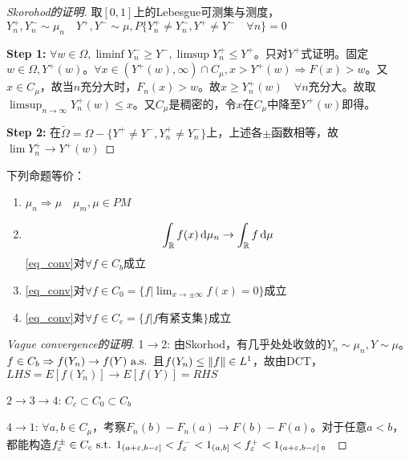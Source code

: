 \documentclass{ctexbook}
\begin{document}
\begin{proof}[Skorohod的证明]
  取$[0,1]$上的Lebesgue可测集与测度，$Y_{n}^{+},Y_{n}^{-}\sim \mu_{n}\quad Y^{+},Y^{-}\sim \mu, P\{Y_{n}^{+}\neq Y_{n}^{-}, Y^{+}\neq Y^{-}\quad\forall n\}=0$

  \textbf{Step 1: } $\forall w\in\Omega,\liminf Y_{n}^{-}\geq Y^{-}, \limsup Y_{n}^{+}\leq Y^{+}$。只对$Y^{+}$式证明。固定$w\in\Omega, Y^{+}(w)$。$\forall x\in (Y^{+}(w),\infty)\cap C_{\mu},x>Y^{+}(w)\Rightarrow F(x)> w$。又$x\in C_{\mu}$，故当$n$充分大时，$F_{n}(x)>w$。故$x\geq Y_{n}^{+}(w)\quad \forall n$充分大。故取$\limsup_{n\to\infty}Y_{n}^{+}(w)\leq x$。又$C_{\mu}$是稠密的，令$x$在$C_{\mu}$中降至$Y^{+}(w)$即得。

  \textbf{Step 2: } 在$\tilde\Omega=\Omega-\{Y^{+}\neq Y^{-}, Y^{+}_{n}\neq Y^{-}_{n}\}$上，上述各$\pm$函数相等，故$\lim Y_{n}^{+}\to Y^{+}(w)$
  
\end{proof}

\begin{Thm}
  下列命题等价：
  \begin{enumerate}
  \item $\mu_{n}\Rightarrow \mu\quad \mu_{m},\mu\in PM$
  \item
    \begin{equation}\label{eq_conv}
      \int_{\mathbb{R}}f(x)\,\mathrm{d}\mu_{n}\to \int_{\mathbb{R}}f\,\mathrm{d}\mu
    \end{equation}
   \ref{eq_conv}对$\forall f\in C_{b}$成立
 \item \ref{eq_conv}对$\forall f\in C_{0}=\{f|\lim_{x\to\pm\infty}f(x)=0\}$成立
 \item \ref{eq_conv}对$\forall f\in C_{c}=\{f|f\text{有紧支集}\}$成立
  \end{enumerate}
\end{Thm}

\begin{proof}[Vague convergence的证明]
  1$\to$2: 由Skorhod，有几乎处处收敛的$Y_{n}\sim\mu_{n},Y\sim\mu$。$f\in C_{b}\Rightarrow f(Y_{n})\to f(Y)\text{ a.s. }$且$f(Y_{n})\leq\left\|f\right\|\in L^{1}$，故由DCT，$LHS=E[f(Y_{n})]\to E[f(Y)]=RHS$

  $2\to 3\to 4$: $C_{c}\subset C_{0}\subset C_{b}$

  $4\to 1$: $\forall a,b\in C_{\mu}$，考察$F_{n}(b)-F_{n}(a)\to F(b)-F(a)$。对于任意$a<b$，都能构造$f_{\varepsilon}^{\pm}\in C_{c}\text{ s.t. } 1_{(a+\varepsilon,b-\varepsilon]}<f_{\varepsilon}^{-}<1_{(a,b]}<f^{+}_{\varepsilon}<1_{(a+\varepsilon,b-\varepsilon]}$。
\end{proof}
\end{document}
